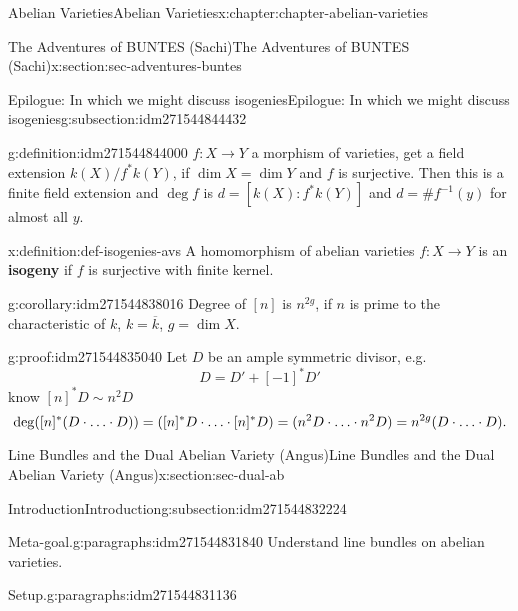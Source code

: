 \documentclass[oneside,10pt,]{book}
\newcommand{\terminology}[1]{\textbf{#1}}
\newcommand{\qedhere}{\relax}
\numberwithin{equation}{section}
\newcommand{\lb}{[}
\newcommand{\rb}{]}
\begin{document}
\begin{chapterptx}{Abelian Varieties}{}{Abelian Varieties}{}{}{x:chapter:chapter-abelian-varieties}
\begin{sectionptx}{The Adventures of BUNTES (Sachi)}{}{The Adventures of BUNTES (Sachi)}{}{}{x:section:sec-adventures-buntes}
\begin{subsectionptx}{Epilogue: In which we might discuss isogenies}{}{Epilogue: In which we might discuss isogenies}{}{}{g:subsection:idm271544844432}
\begin{definition}{}{g:definition:idm271544844000}%
\(f\colon X \to Y\) a morphism of varieties, get a field extension \(k(X)/f^*k(Y)\), if \(\dim X = \dim Y\) and \(f\) is surjective. Then this is a finite field extension and \(\deg f\) is \(d = \lb k(X) : f^*k(Y)\rb\) and \(d = \#f^{-1}(y)\) for almost all \(y\).%
\end{definition}
\begin{definition}{}{x:definition:def-isogenies-avs}%
A homomorphism of abelian varieties \(f\colon X \to Y\) is an \terminology{isogeny} if \(f\) is surjective with finite kernel.%
\end{definition}
\begin{corollary}{}{}{g:corollary:idm271544838016}%
Degree of \(\lb n\rb\) is \(n^{2g}\), if \(n\) is prime to the characteristic of \(k\), \(k = \overline k\), \(g = \dim X\).%
\end{corollary}
\begin{proofptx}{}{g:proof:idm271544835040}
Let \(D\) be an ample symmetric divisor, e.g.%
\begin{equation*}
D = D' + [-1]^* D'
\end{equation*}
know \(\lb n \rb^* D \sim n^2 D\)%
\begin{equation*}
\deg([n]^*(D\cdot\ldots\cdot D)) = ([n]^*D\cdot \ldots\cdot [n]^*D) = (n^2 D\cdot\ldots\cdot n^2 D)= n^{2g} (D\cdot \ldots\cdot D)\text{.}\qedhere
\end{equation*}
%
\end{proofptx}
\end{subsectionptx}
\end{sectionptx}
%
%
\typeout{************************************************}
\typeout{************************************************}
%
\begin{sectionptx}{Line Bundles and the Dual Abelian Variety (Angus)}{}{Line Bundles and the Dual Abelian Variety (Angus)}{}{}{x:section:sec-dual-ab}
%
%
\typeout{************************************************}
\typeout{************************************************}
%
\begin{subsectionptx}{Introduction}{}{Introduction}{}{}{g:subsection:idm271544832224}
\begin{paragraphs}{Meta-goal.}{g:paragraphs:idm271544831840}%
Understand line bundles on abelian varieties.%
\end{paragraphs}%
\begin{paragraphs}{Setup.}{g:paragraphs:idm271544831136}%

\end{paragraphs}
\end{subsectionptx}
\end{sectionptx}
\end{chapterptx}
\end{document}
